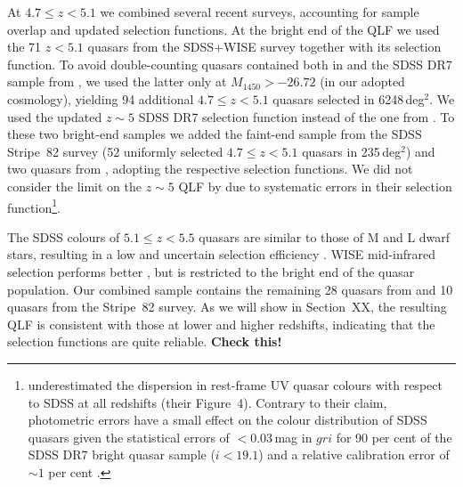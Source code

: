\documentclass[a4paper,fleqn,usenatbib]{mnras}
\begin{document}
At $4.7\le z<5.1$ we combined several recent surveys, accounting for
sample overlap and updated selection functions. At the bright end of
the QLF we used the 71 $z<5.1$ quasars from the SDSS+WISE survey
\citep{2016ApJ...829...33Y} together with its selection function.
To avoid double-counting quasars contained both in
\citet{2016ApJ...829...33Y} and the SDSS DR7 sample from
\citet{2013ApJ...768..105M}, we used the latter only at
$M_{1450}>-26.72$ (in our adopted cosmology), yielding 94 additional
$4.7\le z<5.1$ quasars selected in 6248\,deg$^2$. We used the updated
$z\sim 5$ SDSS DR7 selection function \citep{2013ApJ...768..105M}
instead of the one from \citet{2006AJ....131.2766R}.
To these two bright-end samples we added the faint-end sample from the
\citet{2013ApJ...768..105M} SDSS Stripe~82 survey (52 uniformly
selected $4.7\le z<5.1$ quasars in 235\,deg$^2$) and two quasars from
\citet{2011ApJ...728L..26G}, adopting the respective selection
functions. We did not consider the limit on the $z\sim 5$ QLF by
\citet{2012ApJ...756..160I} due to systematic errors in their
selection function\footnote{\citet{2012ApJ...756..160I} underestimated
  the dispersion in rest-frame UV quasar colours with respect to SDSS
  at all redshifts (their Figure~4). Contrary to their claim,
  photometric errors have a small effect on the colour distribution of
  SDSS quasars given the statistical errors of $<0.03$\,mag in $gri$
  for 90 per cent of the SDSS DR7 bright quasar sample ($i<19.1$) and
  a relative calibration error of $\sim 1$ per cent
  \citep{2008ApJ...674.1217P}.}.

The SDSS colours of $5.1\le z<5.5$ quasars are similar to those of M
and L dwarf stars, resulting in a low and uncertain selection
efficiency \citep{2013ApJ...768..105M}. WISE mid-infrared selection
performs better \citep{2016ApJ...829...33Y}, but is restricted to the
bright end of the quasar population. Our combined sample contains the
remaining 28 quasars from \citet{2016ApJ...829...33Y} and 10 quasars
from the \citet{2013ApJ...768..105M} Stripe~82 survey. As we will show
in Section~XX, the resulting QLF is consistent with those at lower and
higher redshifts, indicating that the \citet{2013ApJ...768..105M}
selection functions are quite reliable. \textbf{Check this!}
\end{document}

